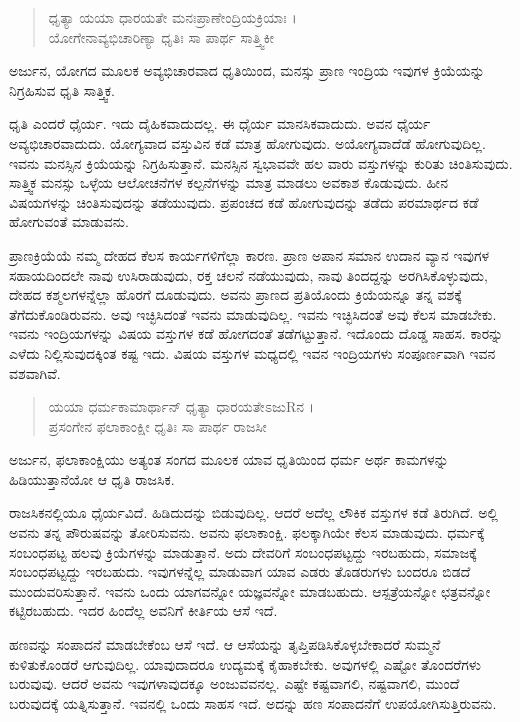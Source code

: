 \begin{verse}
ಧೃತ್ಯಾ ಯಯಾ ಧಾರಯತೇ ಮನಃಪ್ರಾಣೇಂದ್ರಿಯಕ್ರಿಯಾಃ ।\\ಯೋಗೇನಾವ್ಯಭಿಚಾರಿಣ್ಯಾ ಧೃತಿಃ ಸಾ ಪಾರ್ಥ ಸಾತ್ತ್ವಿಕೀ 
\end{verse}

{\small ಅರ್ಜುನ, ಯೋಗದ ಮೂಲಕ ಅವ್ಯಭಿಚಾರವಾದ ಧೃತಿಯಿಂದ, ಮನಸ್ಸು ಪ್ರಾಣ ಇಂದ್ರಿಯ ಇವುಗಳ ಕ್ರಿಯೆಯನ್ನು ನಿಗ್ರಹಿಸುವ ಧೃತಿ ಸಾತ್ತ್ವಿಕ.}

ಧೃತಿ ಎಂದರೆ ಧೈರ್ಯ. ಇದು ದೈಹಿಕವಾದುದಲ್ಲ. ಈ ಧೈರ್ಯ ಮಾನಸಿಕವಾದುದು. ಅವನ ಧೈರ್ಯ ಅವ್ಯಭಿಚಾರವಾದುದು. ಯೋಗ್ಯವಾದ ವಸ್ತುವಿನ ಕಡೆ ಮಾತ್ರ ಹೋಗುವುದು. ಅಯೋಗ್ಯವಾದೆಡೆ ಹೋಗುವುದಿಲ್ಲ. ಇವನು ಮನಸ್ಸಿನ ಕ್ರಿಯೆಯನ್ನು ನಿಗ್ರಹಿಸುತ್ತಾನೆ. ಮನಸ್ಸಿನ ಸ್ವಭಾವವೇ ಹಲ ವಾರು ವಸ್ತುಗಳನ್ನು ಕುರಿತು ಚಿಂತಿಸುವುದು. ಸಾತ್ತ್ವಿಕ ಮನಸ್ಸು ಒಳ್ಳೆಯ ಆಲೋಚನೆಗಳ ಕಲ್ಪನೆಗಳನ್ನು ಮಾತ್ರ ಮಾಡಲು ಅವಕಾಶ ಕೊಡುವುದು. ಹೀನ ವಿಷಯಗಳನ್ನು ಚಿಂತಿಸುವುದನ್ನು ತಡೆಯುವುದು. ಪ್ರಪಂಚದ ಕಡೆ ಹೋಗುವುದನ್ನು ತಡೆದು ಪರಮಾರ್ಥದ ಕಡೆ ಹೋಗುವಂತೆ ಮಾಡುವನು. 

ಪ್ರಾಣಕ್ರಿಯೆಯೆ ನಮ್ಮ ದೇಹದ ಕೆಲಸ ಕಾರ್ಯಗಳಿಗೆಲ್ಲಾ ಕಾರಣ. ಪ್ರಾಣ ಅಪಾನ ಸಮಾನ ಉದಾನ ವ್ಯಾನ ಇವುಗಳ ಸಹಾಯದಿಂದಲೇ ನಾವು ಉಸಿರಾಡುವುದು, ರಕ್ತ ಚಲನೆ ನಡೆಯುವುದು, ನಾವು ತಿಂದದ್ದನ್ನು ಅರಗಿಸಿಕೊಳ್ಳುವುದು, ದೇಹದ ಕಶ್ಮಲಗಳನ್ನೆಲ್ಲಾ ಹೊರಗೆ ದೂಡುವುದು. ಅವನು ಪ್ರಾಣದ ಪ್ರತಿಯೊಂದು ಕ್ರಿಯೆಯನ್ನೂ ತನ್ನ ವಶಕ್ಕೆ ತೆಗೆದುಕೊಂಡಿರುವನು. ಅವು ಇಚ್ಛಿಸಿದಂತೆ ಇವನು ಮಾಡುವುದಿಲ್ಲ. ಇವನು ಇಚ್ಛಿಸಿದಂತೆ ಅವು ಕೆಲಸ ಮಾಡಬೇಕು. ಇವನು ಇಂದ್ರಿಯಗಳನ್ನು ವಿಷಯ ವಸ್ತುಗಳ ಕಡೆ ಹೋಗದಂತೆ ತಡೆಗಟ್ಟುತ್ತಾನೆ. ಇದೊಂದು ದೊಡ್ಡ ಸಾಹಸ. ಕಾರನ್ನು ಎಳೆದು ನಿಲ್ಲಿಸುವುದಕ್ಕಿಂತ ಕಷ್ಟ ಇದು. ವಿಷಯ ವಸ್ತುಗಳ ಮಧ್ಯದಲ್ಲಿ ಇವನ ಇಂದ್ರಿಯಗಳು ಸಂಪೂರ್ಣವಾಗಿ ಇವನ ವಶವಾಗಿವೆ.

\begin{verse}
ಯಯಾ ಧರ್ಮಕಾಮಾರ್ಥಾನ್ ಧೃತ್ಯಾ ಧಾರಯತೇಽಜುRನ ।\\ಪ್ರಸಂಗೇನ ಫಲಾಕಾಂಕ್ಷೀ ಧೃತಿಃ ಸಾ ಪಾರ್ಥ ರಾಜಸೀ 
\end{verse}

{\small ಅರ್ಜುನ, ಫಲಾಕಾಂಕ್ಷಿಯು ಅತ್ಯಂತ ಸಂಗದ ಮೂಲಕ ಯಾವ ಧೃತಿಯಿಂದ ಧರ್ಮ ಅರ್ಥ ಕಾಮಗಳನ್ನು ಹಿಡಿಯುತ್ತಾನೆಯೋ ಆ ಧೃತಿ ರಾಜಸಿಕ.}

ರಾಜಸಿಕನಲ್ಲಿಯೂ ಧೈರ್ಯವಿದೆ. ಹಿಡಿದುದನ್ನು ಬಿಡುವುದಿಲ್ಲ. ಆದರೆ ಅದೆಲ್ಲ ಲೌಕಿಕ ವಸ್ತುಗಳ ಕಡೆ ತಿರುಗಿದೆ. ಅಲ್ಲಿ ಅವನು ತನ್ನ ಪೌರುಷವನ್ನು ತೋರಿಸುವನು. ಅವನು ಫಲಾಕಾಂಕ್ಷಿ. ಫಲಕ್ಕಾಗಿಯೇ ಕೆಲಸ ಮಾಡುವುದು. ಧರ್ಮಕ್ಕೆ ಸಂಬಂಧಪಟ್ಟ ಹಲವು ಕ್ರಿಯೆಗಳನ್ನು ಮಾಡುತ್ತಾನೆ. ಅದು ದೇವರಿಗೆ ಸಂಬಂಧಪಟ್ಟದ್ದು ಇರಬಹುದು, ಸಮಾಜಕ್ಕೆ ಸಂಬಂಧಪಟ್ಟದ್ದು ಇರಬಹುದು. ಇವುಗಳನ್ನೆಲ್ಲ ಮಾಡುವಾಗ ಯಾವ ಎಡರು ತೊಡರುಗಳು ಬಂದರೂ ಬಿಡದೆ ಮುಂದುವರಿಸುತ್ತಾನೆ. ಇವನು ಒಂದು ಯಾಗವನ್ನೋ ಯಜ್ಞವನ್ನೋ ಮಾಡಬಹುದು. ಆಸ್ಪತ್ರೆಯನ್ನೋ ಛತ್ರವನ್ನೋ ಕಟ್ಟಿರಬಹುದು. ಇದರ ಹಿಂದೆಲ್ಲ ಅವನಿಗೆ ಕೀರ್ತಿಯ ಆಸೆ ಇದೆ.

ಹಣವನ್ನು ಸಂಪಾದನೆ ಮಾಡಬೇಕೆಂಬ ಆಸೆ ಇದೆ. ಆ ಆಸೆಯನ್ನು ತೃಪ್ತಿಪಡಿಸಿಕೊಳ್ಳಬೇಕಾದರೆ ಸುಮ್ಮನೆ ಕುಳಿತುಕೊಂಡರೆ ಆಗುವುದಿಲ್ಲ. ಯಾವುದಾದರೂ ಉದ್ಯಮಕ್ಕೆ ಕೈಹಾಕಬೇಕು. ಅವುಗಳಲ್ಲಿ ಎಷ್ಟೋ ತೊಂದರೆಗಳು ಬರುವುವು. ಆದರೆ ಅವನು ಇವುಗಳಾವುದಕ್ಕೂ ಅಂಜುವವನಲ್ಲ. ಎಷ್ಟೇ ಕಷ್ಟವಾಗಲಿ, ನಷ್ಟವಾಗಲಿ, ಮುಂದೆ ಬರುವುದಕ್ಕೆ ಯತ್ನಿಸುತ್ತಾನೆ. ಇವನಲ್ಲಿ ಒಂದು ಸಾಹಸ ಇದೆ. ಅದನ್ನು ಹಣ ಸಂಪಾದನೆಗೆ ಉಪಯೋಗಿಸುತ್ತಿರುವನು.

